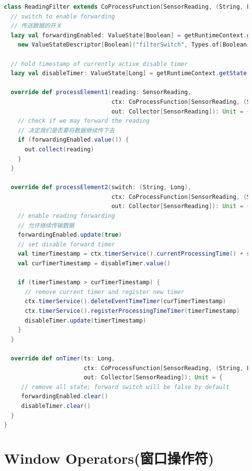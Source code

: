 \documentclass[oneside]{ctexbook}
\begin{document}
\begin{lstlisting}[language=scala]
class ReadingFilter extends CoProcessFunction[SensorReading, (String, Long), SensorReading] {
  // switch to enable forwarding
  // 传送数据的开关
  lazy val forwardingEnabled: ValueState[Boolean] = getRuntimeContext.getState(
    new ValueStateDescriptor[Boolean]("filterSwitch", Types.of[Boolean]))

  // hold timestamp of currently active disable timer
  lazy val disableTimer: ValueState[Long] = getRuntimeContext.getState(new ValueStateDescriptor[Long]("timer", Types.of[Long]))

  override def processElement1(reading: SensorReading,
                               ctx: CoProcessFunction[SensorReading, (String, Long), SensorReading]#Context,
                               out: Collector[SensorReading]): Unit = {
    // check if we may forward the reading
    // 决定我们是否要将数据继续传下去
    if (forwardingEnabled.value()) {
      out.collect(reading)
    }
  }

  override def processElement2(switch: (String, Long),
                               ctx: CoProcessFunction[SensorReading, (String, Long), SensorReading]#Context,
                               out: Collector[SensorReading]): Unit = {
    // enable reading forwarding
    // 允许继续传输数据
    forwardingEnabled.update(true)
    // set disable forward timer
    val timerTimestamp = ctx.timerService().currentProcessingTime() + switch._2
    val curTimerTimestamp = disableTimer.value()

    if (timerTimestamp > curTimerTimestamp) {
      // remove current timer and register new timer
      ctx.timerService().deleteEventTimeTimer(curTimerTimestamp)
      ctx.timerService().registerProcessingTimeTimer(timerTimestamp)
      disableTimer.update(timerTimestamp)
    }
  }

  override def onTimer(ts: Long,
                       ctx: CoProcessFunction[SensorReading, (String, Long), SensorReading]#OnTimerContext,
                       out: Collector[SensorReading]): Unit = {
     // remove all state; forward switch will be false by default
     forwardingEnabled.clear()
     disableTimer.clear()
  }
}
\end{lstlisting}

\section{Window Operators(窗口操作符)}
\end{document}
